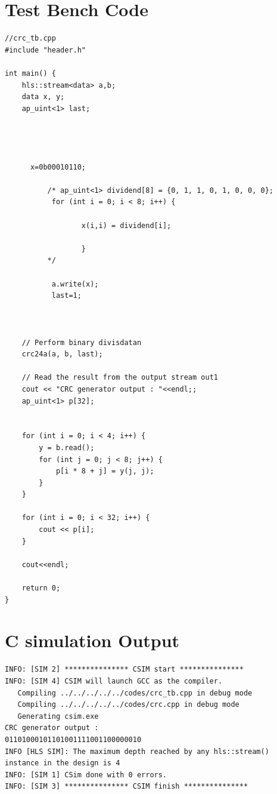 \documentclass{article}
\begin{document}
\section{Test Bench Code}
\begin{lstlisting}
//crc_tb.cpp
#include "header.h"

int main() {
    hls::stream<data> a,b;
    data x, y;
    ap_uint<1> last;




      x=0b00010110;

          /* ap_uint<1> dividend[8] = {0, 1, 1, 0, 1, 0, 0, 0};
   	       for (int i = 0; i < 8; i++) {

   	              x(i,i) = dividend[i];

   	              }
   	      */

   	       a.write(x);
   	       last=1;



    // Perform binary divisdatan
    crc24a(a, b, last);

    // Read the result from the output stream out1
    cout << "CRC generator output : "<<endl;;
    ap_uint<1> p[32];


    for (int i = 0; i < 4; i++) {
        y = b.read();
        for (int j = 0; j < 8; j++) {
            p[i * 8 + j] = y(j, j);
        }
    }

    for (int i = 0; i < 32; i++) {
        cout << p[i];
    }

    cout<<endl;

    return 0;
}

\end{lstlisting}
\vspace{3cm}


\section{C simulation Output}
\begin{lstlisting}
INFO: [SIM 2] *************** CSIM start ***************
INFO: [SIM 4] CSIM will launch GCC as the compiler.
   Compiling ../../../../../codes/crc_tb.cpp in debug mode
   Compiling ../../../../../codes/crc.cpp in debug mode
   Generating csim.exe
CRC generator output : 
01101000101101001111001100000010
INFO [HLS SIM]: The maximum depth reached by any hls::stream() instance in the design is 4
INFO: [SIM 1] CSim done with 0 errors.
INFO: [SIM 3] *************** CSIM finish ***************



\end{lstlisting}
\vspace{10cm}
\end{document}
